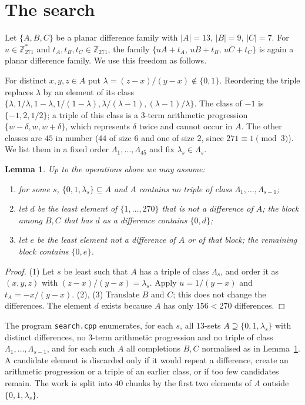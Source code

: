 \documentclass[11pt,a4paper]{article}
\newtheorem{lemma}[theorem]{Lemma}
\theoremstyle{remark}
\newcommand{\Zp}{\mathbb{Z}_{271}}
\begin{document}
\section{The search}\label{s:search}

Let $\{A,B,C\}$ be a planar difference family with $|A|=13$, $|B|=9$, $|C|=7$. For $u\in\Zp^*$ and $t_A,t_B,t_C\in\Zp$, the family $\{uA+t_A,\,uB+t_B,\,uC+t_C\}$ is again a planar difference family. We use this freedom as follows.

For distinct $x,y,z\in A$ put $\lambda=(z-x)/(y-x)\notin\{0,1\}$. Reordering the triple replaces $\lambda$ by an element of its class $\{\lambda,1/\lambda,1-\lambda,1/(1-\lambda),\lambda/(\lambda-1),(\lambda-1)/\lambda\}$. The class of $-1$ is $\{-1,2,1/2\}$; a triple of this class is a $3$-term arithmetic progression $\{w-\delta,w,w+\delta\}$, which represents $\delta$ twice and cannot occur in $A$. The other classes are $45$ in number ($44$ of size $6$ and one of size $2$, since $271\equiv1\pmod 3$). We list them in a fixed order $\Lambda_1,\dots,\Lambda_{45}$ and fix $\lambda_s\in\Lambda_s$.

\begin{lemma}\label{l:norm}
Up to the operations above we may assume:
\begin{enumerate}
\item for some $s$, $\{0,1,\lambda_s\}\subseteq A$ and $A$ contains no triple of class $\Lambda_1,\dots,\Lambda_{s-1}$;
\item let $d$ be the least element of $\{1,\dots,270\}$ that is not a difference of $A$; the block among $B,C$ that has $d$ as a difference contains $\{0,d\}$;
\item let $e$ be the least element not a difference of $A$ or of that block; the remaining block contains $\{0,e\}$.
\end{enumerate}
\end{lemma}
\begin{proof}
(1) Let $s$ be least such that $A$ has a triple of class $\Lambda_s$, and order it as $(x,y,z)$ with $(z-x)/(y-x)=\lambda_s$. Apply $u=1/(y-x)$ and $t_A=-x/(y-x)$. (2), (3) Translate $B$ and $C$; this does not change the differences. The element $d$ exists because $A$ has only $156<270$ differences.
\end{proof}

The program \texttt{search.cpp} enumerates, for each $s$, all $13$-sets $A\supseteq\{0,1,\lambda_s\}$ with distinct differences, no $3$-term arithmetic progression and no triple of class $\Lambda_1,\dots,\Lambda_{s-1}$, and for each such $A$ all completions $B,C$ normalised as in Lemma~\ref{l:norm}. A candidate element is discarded only if it would repeat a difference, create an arithmetic progression or a triple of an earlier class, or if too few candidates remain. The work is split into $40$ chunks by the first two elements of $A$ outside $\{0,1,\lambda_s\}$.
\end{document}
